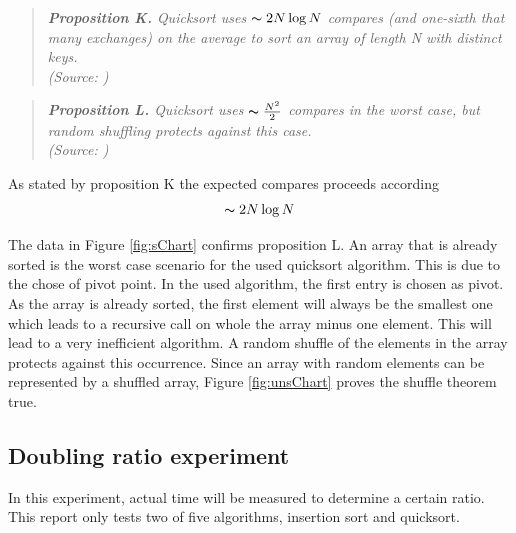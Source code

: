 \documentclass[pdftex,11pt,a4paper,english,titlepage]{article}
\begin{document}
\begin{quote}
\em \noindent \textbf{Proposition K.} Quicksort uses $\thicksim 2N\log N$ compares (and one-sixth that many exchanges) on the average to sort an array of length N with distinct keys.\\
\tiny (Source: \cite{Sedgewick2011})
\end{quote}

\begin{quote}
\em \noindent \textbf{Proposition L.} Quicksort uses $\thicksim\frac{N^2}{2}$ compares in the worst case, but random shuffling protects against this case.\\
\tiny (Source: \cite{Sedgewick2011})
\end{quote}
As stated by proposition K the expected compares proceeds according $$\thicksim 2N\log N$$

The data in Figure \ref{fig:sChart} confirms proposition L. An array that is already sorted is the worst case scenario for the used quicksort algorithm. This is due to the chose of pivot point. In the used algorithm, the first entry is chosen as pivot. As the array is already sorted, the first element will always be the smallest one which leads to a recursive call on whole the array minus one element. This will lead to a very inefficient algorithm. A random shuffle of the elements in the array protects against this occurrence. Since an array with random elements can be represented by a shuffled array, Figure \ref{fig:unsChart} proves the shuffle theorem true.

	
	\subsection{Doubling ratio experiment}\label{sec:DRE}
In this experiment, actual time will be measured to determine a certain ratio. This report only tests two of five algorithms, insertion sort and quicksort.
\end{document}
